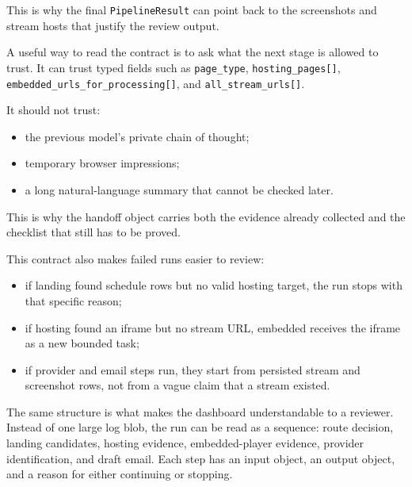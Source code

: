 This is why the final \texttt{PipelineResult} can point back to the screenshots and
stream hosts that justify the review output.

A useful way to read the contract is to ask what the next stage is allowed to trust.
It can trust typed fields such as \texttt{page\_type}, \texttt{hosting\_pages[]},
\texttt{embedded\_urls\_for\_processing[]}, and \texttt{all\_stream\_urls[]}.

It should not trust:
\begin{itemize}
  \item the previous model's private chain of thought;
  \item temporary browser impressions;
  \item a long natural-language summary that cannot be checked later.
\end{itemize}

This is why the handoff object carries both the evidence already collected and the
checklist that still has to be proved.

This contract also makes failed runs easier to review:
\begin{itemize}
  \item if landing found schedule rows but no valid hosting target, the run stops with
  that specific reason;
  \item if hosting found an iframe but no stream URL, embedded receives the iframe as a
  new bounded task;
  \item if provider and email steps run, they start from persisted stream and
  screenshot rows, not from a vague claim that a stream existed.
\end{itemize}

The same structure is what makes the dashboard understandable to a reviewer.
Instead of one large log blob, the run can be read as a sequence: route decision,
landing candidates, hosting evidence, embedded-player evidence, provider
identification, and draft email. Each step has an input object, an output object,
and a reason for either continuing or stopping.

